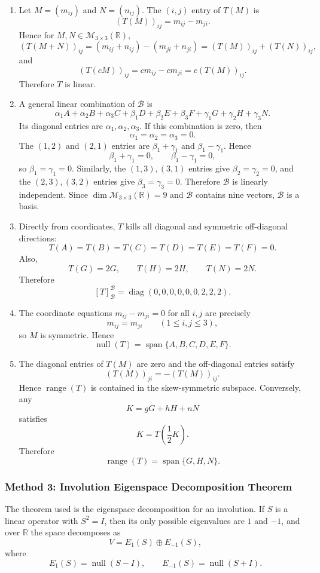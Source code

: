 \documentclass[12pt]{article}
\newcommand{\R}{\mathbb{R}}
\newcommand{\M}{\mathcal{M}}
\newcommand{\B}{\mathcal{B}}
\newcommand{\Null}{\operatorname{null}}
\newcommand{\Range}{\operatorname{range}}
\newcommand{\Span}{\operatorname{span}}
\newcommand{\diag}{\operatorname{diag}}
\begin{document}
\begin{enumerate}[label=(\alph*)]
  \item Let $M=(m_{ij})$ and $N=(n_{ij})$. The $(i,j)$ entry of $T(M)$ is
  \[
  (T(M))_{ij}=m_{ij}-m_{ji}.
  \]
  Hence for $M,N\in\M_{3\times3}(\R)$,
  \[
  (T(M+N))_{ij}=(m_{ij}+n_{ij})-(m_{ji}+n_{ji})=(T(M))_{ij}+(T(N))_{ij},
  \]
  and
  \[
  (T(cM))_{ij}=cm_{ij}-cm_{ji}=c(T(M))_{ij}.
  \]
  Therefore $T$ is linear.

  \item A general linear combination of $\B$ is
  \[
  \alpha_1A+\alpha_2B+\alpha_3C+\beta_1D+\beta_2E+\beta_3F+\gamma_1G+\gamma_2H+\gamma_3N.
  \]
  Its diagonal entries are $\alpha_1,\alpha_2,\alpha_3$. If this combination is zero, then
  \[
  \alpha_1=\alpha_2=\alpha_3=0.
  \]
  The $(1,2)$ and $(2,1)$ entries are $\beta_1+\gamma_1$ and $\beta_1-\gamma_1$. Hence
  \[
  \beta_1+\gamma_1=0,
  \qquad
  \beta_1-\gamma_1=0,
  \]
  so $\beta_1=\gamma_1=0$. Similarly, the $(1,3),(3,1)$ entries give $\beta_2=\gamma_2=0$, and the $(2,3),(3,2)$ entries give $\beta_3=\gamma_3=0$. Therefore $\B$ is linearly independent. Since $\dim\M_{3\times3}(\R)=9$ and $\B$ contains nine vectors, $\B$ is a basis.

  \item Directly from coordinates, $T$ kills all diagonal and symmetric off-diagonal directions:
  \[
  T(A)=T(B)=T(C)=T(D)=T(E)=T(F)=0.
  \]
  Also,
  \[
  T(G)=2G,
  \qquad
  T(H)=2H,
  \qquad
  T(N)=2N.
  \]
  Therefore
  \[
  \boxed{
  [T]_{\B}^{\B}=\diag(0,0,0,0,0,0,2,2,2).}
  \]

  \item The coordinate equations $m_{ij}-m_{ji}=0$ for all $i,j$ are precisely
  \[
  m_{ij}=m_{ji}
  \qquad(1\le i,j\le 3),
  \]
  so $M$ is symmetric. Hence
  \[
  \boxed{\Null(T)=\Span\{A,B,C,D,E,F\}.}
  \]

  \item The diagonal entries of $T(M)$ are zero and the off-diagonal entries satisfy
  \[
  (T(M))_{ji}=-(T(M))_{ij}.
  \]
  Hence $\Range(T)$ is contained in the skew-symmetric subspace. Conversely, any
  \[
  K=gG+hH+nN
  \]
  satisfies
  \[
  K=T\left(\frac12K\right).
  \]
  Therefore
  \[
  \boxed{\Range(T)=\Span\{G,H,N\}.}
  \]
\end{enumerate}

\newpage
\subsubsection{Method 3: Involution Eigenspace Decomposition Theorem}
The theorem used is the eigenspace decomposition for an involution. If $S$ is a linear operator with $S^2=I$, then its only possible eigenvalues are $1$ and $-1$, and over $\R$ the space decomposes as
\[
V=E_1(S)\oplus E_{-1}(S),
\]
where
\[
E_1(S)=\Null(S-I),
\qquad
E_{-1}(S)=\Null(S+I).
\]
\end{document}
